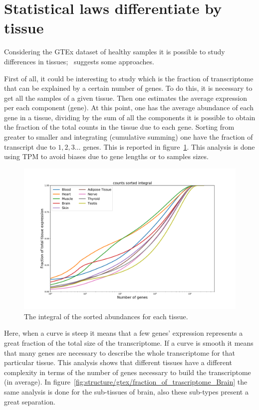 \section{Statistical laws differentiate by tissue}
Considering the GTEx dataset of healthy samples it is possible to study differences in tissues;~\cite{mele2014} suggests some approaches.

First of all, it could be interesting to study which is the fraction of transcriptome that can be explained by a certain number of genes.
To do this, it is necessary to get all the samples of a given tissue. Then one estimates the average expression per each component (gene). At this point, one has the average abundance of each gene in a tissue, dividing by the sum of all the components it is possible to obtain the fraction of the total counts in the tissue due to each gene. Sorting from greater to smaller and integrating (cumulative summing) one have the fraction of transcript due to $1, 2, 3\dots$ genes. This is reported in figure~\ref{fig:structure/gtex/fraction_of_trascriptome}. This analysis is done using TPM to avoid biases due to gene lengths or to samples sizes.
\begin{figure}[htb!]
  \centering
  \includegraphics[width=0.9\linewidth]{pictures/structure/gtex/fraction_of_trascriptome.pdf}
  \caption{The integral of the sorted abundances for each tissue.}
  \label{fig:structure/gtex/fraction_of_trascriptome}
\end{figure}
\FloatBarrier
Here, when a curve is steep it means that a few genes' expression represents a great fraction of the total size of the transcriptome. If a curve is smooth it means that many genes are necessary to describe the whole transcriptome for that particular tissue. This analysis shows that different tissues have a different complexity in terms of the number of genes necessary to build the transcriptome (in average). In figure~\ref{fig:structure/gtex/fraction_of_trascriptome_Brain} the same analysis is done for the sub-tissues of brain, also these sub-types present a great separation.
